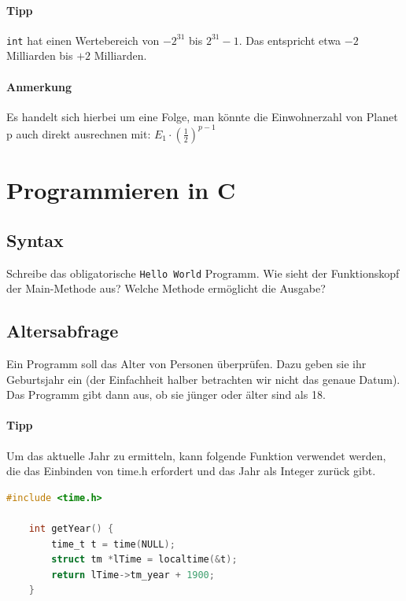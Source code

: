 \documentclass[11pt, a4paper]{article}
\begin{document}
\paragraph{Tipp} \texttt{int} hat einen Wertebereich von $-2^{31}$ bis $2^{31}-1$. Das entspricht etwa $-2$ Milliarden bis $+2$ Milliarden.
\paragraph{Anmerkung} Es handelt sich hierbei um eine Folge, man könnte die Einwohnerzahl von Planet p auch direkt ausrechnen mit: $E_1 \cdot \left(\frac{1}{2}\right)^{p-1}$

\newpage
\section{Programmieren in C}
\subsection{Syntax}
Schreibe das obligatorische \texttt{Hello World} Programm. Wie sieht der Funktionskopf der Main-Methode aus? Welche Methode ermöglicht die Ausgabe?

\subsection{Altersabfrage}
Ein Programm soll das Alter von Personen überprüfen. Dazu geben sie ihr Geburtsjahr ein (der Einfachheit halber betrachten wir nicht das genaue Datum). Das Programm gibt dann aus, ob sie jünger oder älter sind als 18.

\paragraph{Tipp} Um das aktuelle Jahr zu ermitteln, kann folgende Funktion verwendet werden, die das Einbinden von time.h erfordert und das Jahr als Integer zurück gibt.
\begin{lstlisting}[language=C]
	#include <time.h>

	int getYear() {
		time_t t = time(NULL);
		struct tm *lTime = localtime(&t);
		return lTime->tm_year + 1900;
	}
\end{lstlisting}
\end{document}
